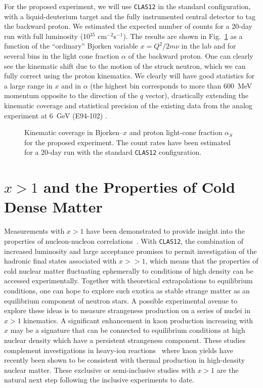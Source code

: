 For the proposed experiment, we will use {\tt CLAS12} in the standard
configuration, with a liquid-deuterium target and the fully 
instrumented central detector to tag the backward proton. We estimated 
the expected number of counts for a 20-day run with full luminosity
(10$^{35}$ cm$^{-2}$s$^{-1}$). The results are shown in Fig.~\ref{deeps}
as a function of the ``ordinary'' Bjorken variable $x = Q^2/2m\nu$
in the lab and for several bins in the light cone fraction $\alpha$ of
the backward proton. One can clearly see the kinematic shift due to the 
motion of the struck neutron, which we can fully correct using the proton 
kinematics.  We clearly will have good statistics for a large range in 
$x$ and in $\alpha$ (the highest bin corresponds to more than
600~MeV momentum opposite to the direction of the $q$ vector),
drastically extending the kinematic coverage and statistical precision
of the existing data from the analog experiment at 6~GeV (E94-102)
\cite{e94102}.

\begin{figure}[htbp]
\vspace{8.6cm}
\caption{\small{Kinematic coverage in Bjorken--$x$ and proton light-cone 
fraction $\alpha_S$ for the proposed experiment. The count rates have
been estimated for a 20-day run with the standard {\tt CLAS12} 
configuration.}}
\label{deeps}
\end{figure}

\section{$x>1$ and the Properties of Cold Dense Matter} 

Measurements with $x>1$ have been demonstrated to provide insight into
the properties of nucleon-nucleon correlations~\cite{EGIYAN,ARRINGTON}. 
With {\tt CLAS12}, the combination of increased luminosity and large 
acceptance promises to permit investigation of the hadronic final states 
associated with $x>>1$, which means that the properties of cold nuclear 
matter fluctuating ephemerally to conditions of high density can be 
accessed experimentally.  Together with theoretical extrapolations to 
equilibrium conditions, one can hope to explore such exotica as stable 
strange matter as an equilibrium component of neutron stars. A
possible experimental avenue to explore these ideas is to measure
strangeness production on a series of nuclei in $x>1$ kinematics. A
significant enhancement in kaon production increasing with $x$ may be
a signature that can be connected to equilibrium conditions at high
nuclear density which have a persistent strangeness component. These
studies complement investigations in heavy-ion reactions~\cite{GSI}
where kaon yields have recently been shown to be consistent with
thermal production in high-density nuclear matter. These exclusive or
semi-inclusive studies with $x>1$ are the natural next step following
the inclusive experiments to date. 

